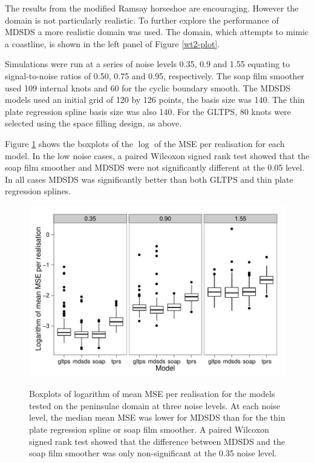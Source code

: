 \documentclass[useAMS, referee]{biom}
\begin{document}
The results from the modified Ramsay horseshoe are encouraging. However the domain is not particularly realistic. To further explore the performance of MDSDS a more realistic domain was used. The domain, which attempts to mimic a coastline, is shown in the left panel of Figure \ref{wt2-plot}.

Simulations were run at a series of noise levels 0.35, 0.9 and 1.55 equating to signal-to-noise ratios of 0.50, 0.75 and 0.95, respectively. The soap film smoother used 109 internal knots and 60 for the cyclic boundary smooth. The MDSDS models used an initial grid of 120 by 126 points, the basis size was 140. The thin plate regression spline basis size was also 140. For the GLTPS, 80 knots were selected using the space filling design, as above.

Figure \ref{wt2-boxplots} shows the boxplots of the $\log$ of the MSE per realisation for each model. In the low noise cases, a paired Wilcoxon signed rank test showed that the soap film smoother and MDSDS were not significantly different at the 0.05 level. In all cases MDSDS was significantly better than both GLTPS and thin plate regression splines.


\begin{figure}
\centering
\includegraphics{examples/wt2/wt2-result.pdf} \\
\caption{Boxplots of logarithm of mean MSE per realisation for the models tested on the peninsulae domain at three noise levels. At each noise level, the median mean MSE was lower for MDSDS than for the thin plate regression spline or soap film smoother. A paired Wilcoxon signed rank test showed that the difference between MDSDS and the soap film smoother was only non-significant at the 0.35 noise level.}
\label{wt2-boxplots}
\end{figure}
\end{document}
